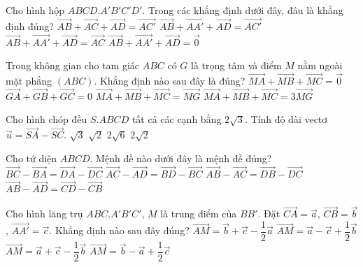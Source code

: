 \begin{ex}
	Cho hình hộp $ABCD.A'B'C'D'$. Trong các khẳng định dưới đây, đâu là khẳng định đúng?
	\choice
	{$\vec{AB}+\vec{AC}+\vec{AD}=\vec{AC'}$}
	{\True $\vec{AB}+\vec{AA'}+\vec{AD}=\vec{AC'}$}
	{$\vec{AB}+\vec{AA'}+\vec{AD}=\vec{AC}$}
	{$\vec{AB}+\vec{AA'}+\vec{AD}=\vec{0}$}
\end{ex}
\begin{ex}
	Trong không gian cho tam giác $ABC$ có $G$ là trọng tâm và điểm $M$ nằm ngoài mặt phẳng $(ABC)$. Khẳng định nào sau đây là đúng?
	\choice
	{$\vec{MA}+\vec{MB}+\vec{MC}=\vec{0}$}
	{$\vec{GA}+\vec{GB}+\vec{GC}=0$}
	{$\vec{MA}+\vec{MB}+\vec{MC}=\vec{MG}$}
	{\True $\vec{MA}+\vec{MB}+\vec{MC}=3\vec{MG}$}
\end{ex}
\begin{ex}
	Cho hình chóp đều $S.ABCD$ tất cả các cạnh bằng $2\sqrt{3}$. Tính độ dài vectơ  $\vec{u}=\vec{SA}-\vec{SC}$.
	\choice
	{$\sqrt{3}$}
	{$\sqrt{2}$}
	{\True $2\sqrt{6}$}
	{$2\sqrt{2}$}
\end{ex}
\begin{ex}
	Cho tứ diện $ABCD$. Mệnh đề nào dưới đây là mệnh đề đúng?
	\choice
	{$\vec{BC}-\vec{BA}=\vec{DA}-\vec{DC}$}
	{$\vec{AC}-\vec{AD}=\vec{BD}-\vec{BC}$}
	{\True $\vec{AB}-\vec{AC}=\vec{DB}-\vec{DC}$}
	{$\vec{AB}-\vec{AD}=\vec{CD}-\vec{CB}$}
\end{ex}
\begin{ex}
	Cho hình lăng trụ $ABC.A'B'C'$, $M$ là trung điểm của $BB'$. Đặt $\vec{CA}=\vec{a}$, $\vec{CB}=\vec{b}$, $\vec{AA'}=\vec{c}$. Khẳng định nào sau đây đúng?
	\choice
	{$\vec{AM}=\vec{b}+\vec{c}-\dfrac{1}{2}\vec{a}$}
	{$\vec{AM}=\vec{a}-\vec{c}+\dfrac{1}{2}\vec{b}$}
	{$\vec{AM}=\vec{a}+\vec{c}-\dfrac{1}{2}\vec{b}$}
	{\True $\vec{AM}=\vec{b}-\vec{a}+\dfrac{1}{2}\vec{c}$}
\end{ex}
